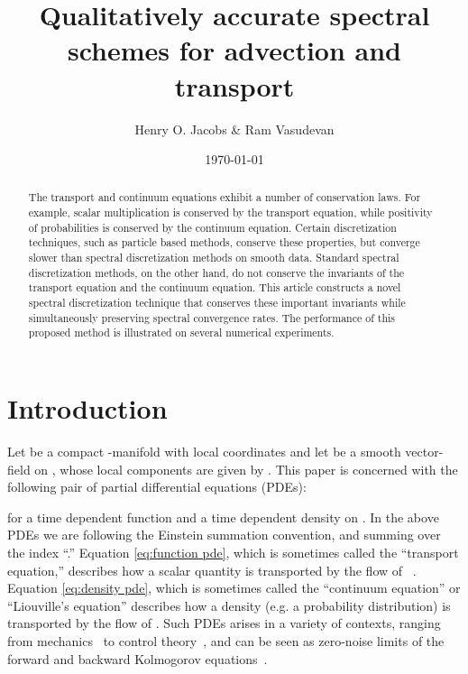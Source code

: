 \documentclass[final,leqno]{amsart}
\title{Qualitatively accurate spectral schemes for advection and transport}
\author{Henry O. Jacobs \& Ram Vasudevan}
\date{\today}
\begin{document}
\maketitle

\begin{abstract}
	The transport and continuum equations exhibit a number of conservation laws.
	For example, scalar multiplication is conserved by the transport equation, while
	positivity of probabilities is conserved by the continuum equation.
	Certain discretization techniques, such as particle based methods, conserve these properties, but converge slower than spectral discretization methods on smooth data.
	Standard spectral discretization methods, on the other hand, do not conserve the invariants of the transport equation and the continuum equation.
	This article constructs a novel spectral discretization technique that conserves these important invariants while simultaneously preserving spectral convergence rates. 
	The performance of this proposed method is illustrated on several numerical experiments. 
\end{abstract}

\section{Introduction}
\label{sec:intro}

Let  be a compact -manifold with local coordinates 
and let  be a smooth vector-field on , whose local components are given by . 
This paper is concerned with the following pair of partial differential equations (PDEs):

for a time dependent function  and a time dependent density  on .
In the above PDEs we are following the Einstein summation convention, and summing over the index ``.''
Equation \eqref{eq:function pde}, which is sometimes called the ``transport equation,'' describes how a scalar quantity is transported by the flow of ~\cite{Truesdell1991}.
Equation \eqref{eq:density pde}, which is sometimes called the ``continuum equation'' or ``Liouville's equation'' describes how a density (e.g. a probability distribution) is transported by the flow of .
Such PDEs arises in a variety of contexts, ranging from  mechanics~\cite{Batchelor1999,Truesdell1991} to control theory~\cite{HenrionKorda2014}, and can be seen as zero-noise limits of the forward and backward Kolmogorov equations~\cite{Oksendal2003}.
\end{document}
